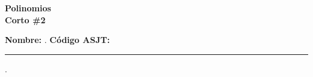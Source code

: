 \begin{center} \textbf
{
    \Large Polinomios \\ \vspace{2mm}Corto \#2
}
\end{center}

\vspace{8mm}

\textbf{Nombre:} \hrulefill.
\textbf{Código ASJT:} \rule{4cm}{0.1mm}.

\thispagestyle{first-page-style}